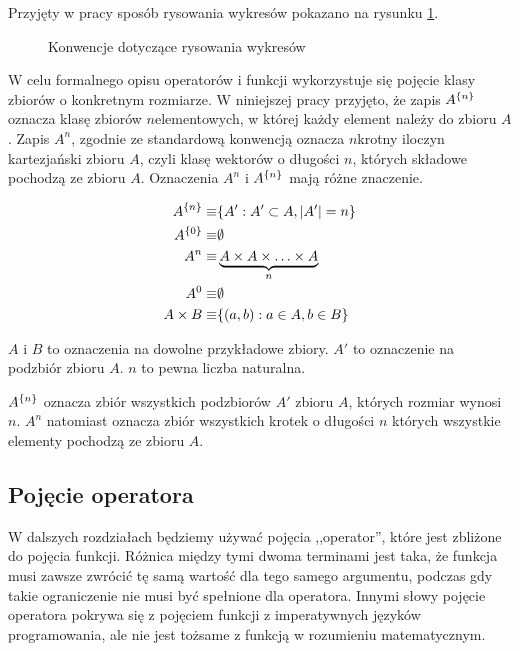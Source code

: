 \documentclass[./FM_mgr.tex]{subfiles}
\begin{document}
Przyjęty w pracy sposób rysowania wykresów pokazano na rysunku \ref{plot:conventions}.

\begin{figure}
	\centering
	\caption{Konwencje dotyczące rysowania wykresów \label{plot:conventions}}
\end{figure}

W celu formalnego opisu operatorów i funkcji wykorzystuje się pojęcie klasy zbiorów o konkretnym rozmiarze. W niniejszej pracy przyjęto, że zapis ${A}^{ \{ n \}}$ oznacza klasę zbiorów $n$elementowych, w której każdy element należy do zbioru $A$. Zapis $A^n$, zgodnie ze standardową konwencją oznacza $n$krotny iloczyn kartezjański zbioru $A$, czyli klasę wektorów o długości $n$, których składowe pochodzą ze zbioru $A$. Oznaczenia $A^{n}$ i ${A}^{ \{ n \}}$ mają różne znaczenie.

\begin{align}
	{A}^{ \{ n \}} \equiv &\{ A': A' \subset A, |A'|=n  \} \\
	{A}^{ \{ 0 \}} \equiv &\emptyset \\
	A^n \equiv &\underbrace{A \times A \times \ldots \times A}_{n} \\
	A^0 \equiv &\emptyset \\
	A \times B \equiv &\{ (a, b): a \in A, b \in B \}
\end{align}

$A$ i $B$ to oznaczenia na dowolne przykładowe zbiory. 
$A'$ to oznaczenie na podzbiór zbioru $A$.
$n$ to pewna liczba naturalna.

${A}^{ \{ n \}}$ oznacza zbiór wszystkich podzbiorów $A'$ zbioru $A$, których rozmiar wynosi $n$.
$A^n$ natomiast oznacza zbiór wszystkich krotek o długości $n$ których wszystkie elementy pochodzą ze zbioru $A$.

\subsection{Pojęcie operatora} \label{subsection:operator}

W dalszych rozdziałach będziemy używać pojęcia ,,operator'', które jest zbliżone do pojęcia funkcji. 
Różnica między tymi dwoma terminami jest taka, że funkcja musi zawsze zwrócić tę samą wartość dla tego samego argumentu, podczas gdy takie ograniczenie nie musi być spełnione dla operatora. Innymi słowy pojęcie operatora pokrywa się z pojęciem funkcji z imperatywnych języków programowania, ale nie jest tożsame z funkcją w rozumieniu matematycznym.
\end{document}
